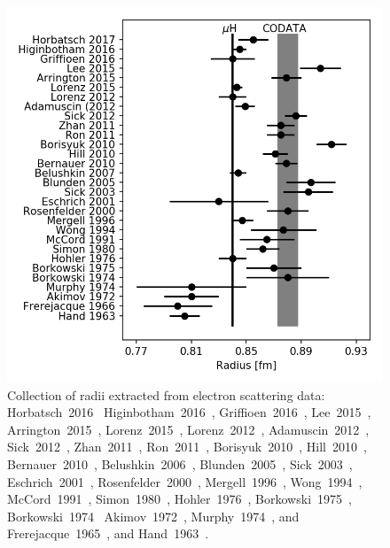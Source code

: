 \documentclass[10pt,aps,prc,twocolumn]{revtex4-1}
\begin{document}
\begin{figure}[htb]
\includegraphics[width=\columnwidth]{Figure/ScatteringResults.png}
\caption{Collection of radii extracted from electron scattering data:  
Horbatsch~2016~{\cite{Horbatsch:2016ilr}}
Higinbotham~2016~{\cite{Higinbotham:2015rja}},
Griffioen~2016~{\cite{Griffioen:2015hta}},
Lee~2015~{\cite{Lee:2015jqa}},
Arrington~2015~{\cite{Arrington:2015ria}},
Lorenz~2015~{\cite{Lorenz:2014yda,Lorenz:2014vha}},
Lorenz~2012~{\cite{Lorenz:2012tm}},
Adamuscin~2012~{\cite{Adamuscin:2012zz}},
Sick~2012~{\cite{Sick:2012zz}},
Zhan~2011~{\cite{Zhan:2011ji}},
Ron~2011~{\cite{Ron:2011rd}},
Borisyuk~2010~{\cite{Borisyuk:2009mg}},
Hill~2010~{\cite{Hill:2010yb}},
Bernauer~2010~{\cite{Bernauer:2010wm}},
Belushkin~2006~{\cite{Belushkin:2006qa}},
Blunden~2005~{\cite{Blunden:2005jv}},
Sick~2003~{\cite{Sick:2003gm}},
Eschrich~2001~\cite{GoughEschrich:2001ji},
Rosenfelder~2000~{\cite{Rosenfelder:1999cd}},
Mergell~1996~{\cite{Mergell:1995bf}},
Wong~1994~\cite{Wong:1994sy},
McCord~1991~\cite{McCord:1991sd},
Simon~1980~\cite{Simon:1980hu},
Hohler~1976~\cite{Hohler:1976ax},
Borkowski~1975~\cite{Borkowski:1975ume},
Borkowski~1974~\cite{Borkowski:1974tm,Borkowski:1974mb}
Akimov~1972~\cite{Akimov:1972nu},
Murphy~1974~\cite{Murphy:1974zz}, and
Frerejacque~1965~\cite{Frerejacque:1965ic}, and
Hand~1963~\cite{Hand:1963zz}.}
\label{collection}
\end{figure}
\end{document}
